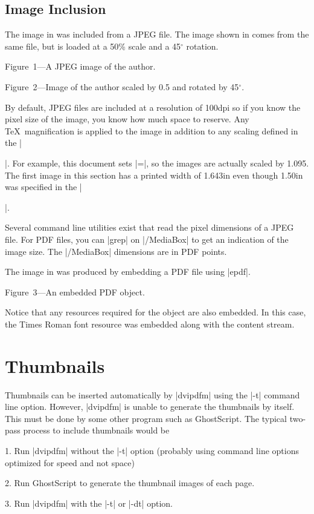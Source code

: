 {
\subsection{Image Inclusion}
 
The image in  was included from a JPEG file.
The image shown in  comes from the same file,
but is loaded at a 50\% scale and a 45$^\circ$ rotation.

\topinsert
{}
\bigskip
\centerline{}
\medskip
\centerline{\subheadingfont
\begincolor{\blue}Figure~1---A JPEG image of the author.\endcolor}
\bigskip
\endinsert

\topinsert
{}
\bigskip
\centerline{}
\medskip
\centerline{\subheadingfont
\begincolor{\blue}Figure~2---Image of the author scaled by 0.5 and rotated
by 45$^\circ$.%
\endcolor}
\bigskip
\endinsert

By default, JPEG files are included
at a resolution of 100dpi so if you know the pixel size
of the image, you know how much space to reserve.
Any \TeX\ magnification is applied to the image
in addition to any scaling defined in the |\special|.
For example, this document sets |\magnification=\magstephalf|,
so the images are actually scaled by 1.095.  The first
image in this section has a printed width of 1.643in
even though 1.50in was specified in the |\special|.

Several command line utilities exist that read
the pixel dimensions of a JPEG file.  For PDF files,
you can |grep| on |/MediaBox| to get an indication
of the image size.  The |/MediaBox| dimensions are
in PDF points.

The image in  was produced by embedding a PDF file
using |epdf|.

\topinsert
{}
\centerline{}
\medskip\centerline{\subheadingfont
\begincolor{\blue}Figure~3---An embedded PDF object.
\endcolor}
\endinsert
Notice that any resources required for the object
are also embedded.  In this case, the Times Roman font
resource was embedded along with the content stream.

\section{Thumbnails}
Thumbnails can be inserted automatically by |dvipdfm|
using the |-t| command line option.  However, |dvipdfm|
is unable to generate the thumbnails by itself.  This
must be done by some other program such as GhostScript.
The typical two-pass process to include thumbnails would be
\item{1.}
Run |dvipdfm| without the |-t| option (probably
using command line options optimized for speed and not space)
\item{2.}
Run GhostScript to generate the thumbnail images of
each page.
\item{3.}
Run |dvipdfm| with the |-t| or |-dt| option.

}
